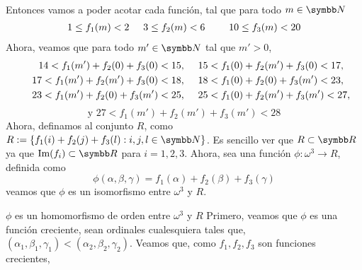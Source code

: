 \documentclass{article}
\begin{document}
\begin{itemize}
\[\begin{aligned}
            \end{aligned}
        \]
        Entonces vamos a poder acotar cada función, tal que para todo \(m \in \realN\) 
        \[
            \begin{aligned}
                1 \leq f_1(m) < 2 &
                \hspace{0.5cm}
                3 \leq f_2(m) < 6 &
                \hspace{0.5cm}
                10 \leq f_3(m) < 20
            \end{aligned}
        \]
        Ahora, veamos que para todo \(m' \in \realN\) tal que \(m' > 0\),
        \[
            \begin{aligned}
                14 < f_1(m') + f_2(0) + f_3(0) < 15, &
                \hspace{0.5cm}
                15 < f_1(0) + f_2(m') + f_3(0) < 17, \\
                \hspace{0.5cm}
                17 < f_1(m') + f_2(m') + f_3(0) < 18, &
                \hspace{0.5cm}
                18 < f_1(0) + f_2(0) + f_3(m') < 23, \\
                \hspace{0.5cm}
                23 < f_1(m') + f_2(0) + f_3(m') < 25, &
                \hspace{0.5cm}
                25 < f_1(0) + f_2(m') + f_3(m') < 27, \\
            \end{aligned}
        \]
        \vspace{-0.25cm}
        \[
                \text{y } 27 < f_1(m') + f_2(m') + f_3(m') < 28
        \]
        Ahora, definamos al conjunto \(R\), como \(R := \left\{f_1(i) + f_2(j) + f_3(l): i, j, l \in \realN \right\}\). 
        Es sencillo ver que \(R \subset \realR\) ya que \(\text{Im}(f_i) \subset \realR\) para \(i = 1, 2, 3\). 
        Ahora, sea una función \(\phi: \omega^3 \rightarrow R\), definida como
        \[
            \phi(\alpha, \beta, \gamma) = f_1(\alpha) + f_2(\beta) + f_3(\gamma)
        \]
        veamos que \(\phi\) es un isomorfismo entre \(\omega^3\) y \(R\).
        \ResetCases{}
        \begin{mathcase}{\(\phi\) es un homomorfismo de orden entre \(\omega^3\) y \(R\)}
            \vspace{-0.4cm}
            Primero, veamos que \(\phi\) es una función creciente, sean ordinales cualesquiera tales que,
            \((\alpha_1, \beta_1, \gamma_1) < (\alpha_2, \beta_2, \gamma_2)\). Veamos que, como \(f_1, f_2, f_3\) son funciones crecientes, 

\end{mathcase}
\end{itemize}
\end{document}
